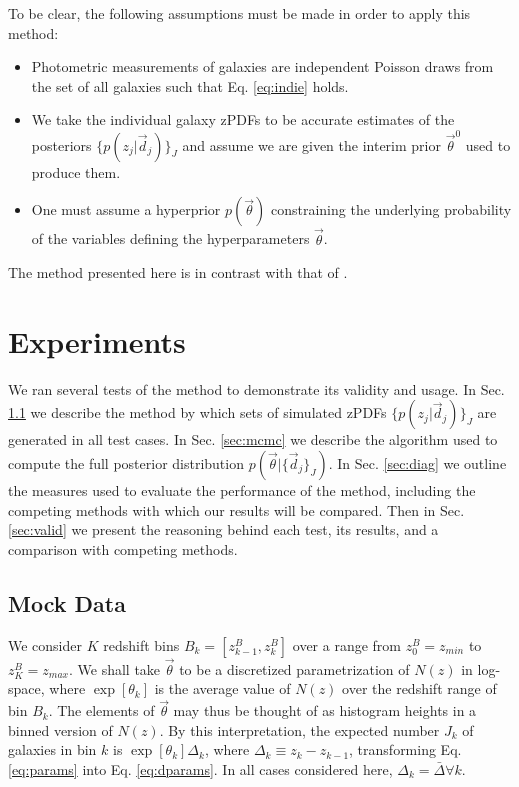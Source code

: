 \documentclass[preprint]{aastex}
\begin{document}
To be clear, the following assumptions must be made in order to apply this method:

\begin{itemize}
\item Photometric measurements of galaxies are independent Poisson draws from the set of all galaxies such that Eq. \ref{eq:indie} holds.
\item We take the individual galaxy zPDFs to be accurate estimates of the posteriors $\{p(z_{j}|\vec{d}_{j})\}_{J}$ and assume we are given the interim prior $\vec{\theta}^{0}$ used to produce them.
\item One must assume a hyperprior $p(\vec{\theta})$ constraining the underlying probability of the variables defining the hyperparameters $\vec{\theta}$.
\end{itemize}

The method presented here is in contrast with that of \citet{she11}.  

\section{Experiments}
\label{sec:exp}

We ran several tests of the method to demonstrate its validity and usage.  In Sec. \ref{sec:mock} we describe the method by which sets of simulated zPDFs $\{p(z_{j}|\vec{d}_{j})\}_{J}$ are generated in all test cases.  In Sec. \ref{sec:mcmc} we describe the algorithm used to compute the full posterior distribution $p(\vec{\theta}|\{\vec{d}_{j}\}_{J})$.  In Sec. \ref{sec:diag} we outline the measures used to evaluate the performance of the method, including the competing methods with which our results will be compared.  Then in Sec. \ref{sec:valid} we present the reasoning behind each test, its results, and a comparison with competing methods.

\subsection{Mock Data}
\label{sec:mock}

We consider $K$ redshift bins $B_{k}=[z^{B}_{k-1},z^{B}_{k}]$ over a range from $z^{B}_{0}=z_{min}$ to $z^{B}_{K}=z_{max}$.  We shall take $\vec{\theta}$ to be a discretized parametrization of $N(z)$ in log-space, where $\exp[\theta_{k}]$ is the average value of $N(z)$ over the redshift range of bin $B_{k}$.   The elements of $\vec{\theta}$ may thus be thought of as histogram heights in a binned version of $N(z)$.  By this interpretation, the expected number $J_{k}$ of galaxies in bin $k$ is $\exp[\theta_{k}]\Delta_{k}$, where $\Delta_{k}\equiv z_{k}-z_{k-1}$, transforming Eq. \ref{eq:params} into Eq. \ref{eq:dparams}.  In all cases considered here, $\Delta_{k}=\bar{\Delta}\forall k$.
\end{document}
